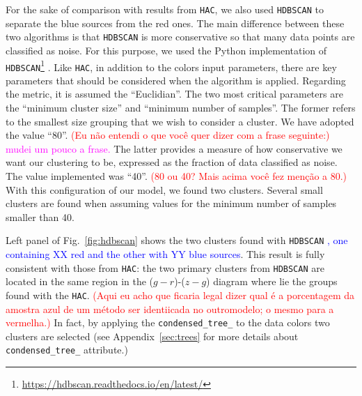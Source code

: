 \documentclass[fleqn,usenatbib]{mnras}
\newcommand{\rlopes}[1]{\textcolor{blue}{#1}}
\newcommand{\comment}[1]{\textcolor{red}{#1}}
\newcommand{\luis}[1]{\textcolor{magenta}{#1}}
\begin{document}
For the sake of comparison with results from \texttt{HAC}, we also used \texttt{HDBSCAN} to separate the blue sources from the red ones. 
The main difference between these two algorithms is that  \texttt{HDBSCAN}
is more conservative so that many data points are classified as noise.
For this purpose, we used the Python implementation of \texttt{HDBSCAN}\footnote{\url{https://hdbscan.readthedocs.io/en/latest/}}
\citep{McInnes:2017}. Like \texttt{HAC}, in addition to the colors input
parameters,  there are key parameters that should be considered  when the algorithm is
applied. 
Regarding the metric, it is assumed the ``Euclidian''.
The two most critical parameters 
are the ``minimum cluster size'' and ``minimum number
of samples''. The former refers to the smallest size grouping that we wish to consider a cluster.
We have adopted the value ``80''. 
\comment{(Eu não entendi o que você quer dizer com a frase seguinte:)} \luis{mudei um pouco a frase.}
The latter provides a measure of how conservative we want 
our clustering to be, expressed as the fraction of data classified as noise.
The value implemented was ``40''.
\comment{(80 ou 40? Mais acima você fez menção a 80.)}
With this configuration 
of our model, 
we found
two 
clusters. 
Several small clusters are found when assuming values for the minimum number of samples smaller than 40.

Left panel of Fig.~\ref{fig:hdbscan} 
shows 
the two 
clusters found with \texttt{HDBSCAN}
\rlopes{, one containing XX red and the other with YY blue sources}. 
This result is fully consistent with those from \texttt{HAC}: the two primary clusters from \texttt{HDBSCAN} are located in the same region in
the ($g - r$)-($z - g$) diagram where lie the groups found with the \texttt{HAC}.
\comment{(Aqui eu acho que ficaria legal dizer qual é a porcentagem da amostra azul de um método ser identiicada no outromodelo; o mesmo para a vermelha.)}
In fact, by applying the
\texttt{condensed\_tree\_} to the data colors two clusters are selected 
(see Appendix~\ref{sec:trees} for more details about \texttt{condensed\_tree\_} attribute.)
\end{document}
